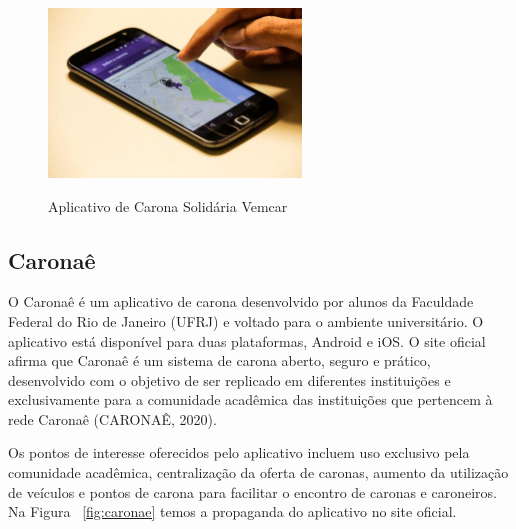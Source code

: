 
\begin{figure}[!hbtp]
	\centering
	\caption{Aplicativo de Carona Solidária Vemcar}
	\includegraphics[width=0.6\textwidth]{./04-figuras/vemcar.jpg}
	\label{fig:tecnologia}
\end{figure}


\subsection{Caronaê}


O Caronaê é um aplicativo de carona desenvolvido por alunos da Faculdade Federal do Rio de Janeiro (UFRJ) e voltado para o ambiente universitário. O aplicativo está disponível para duas plataformas, Android e iOS. O site oficial afirma que Caronaê é um sistema de carona aberto, seguro e prático, desenvolvido com o objetivo de ser replicado em diferentes instituições e exclusivamente para a comunidade acadêmica das instituições que pertencem à rede Caronaê (CARONAÊ, 2020).

Os pontos de interesse oferecidos pelo aplicativo incluem uso exclusivo pela comunidade acadêmica, centralização da oferta de caronas, aumento da utilização de veículos e pontos de carona para facilitar o encontro de caronas e caroneiros. Na Figura ~\ref{fig:caronae} temos a propaganda do aplicativo no site oficial. %

